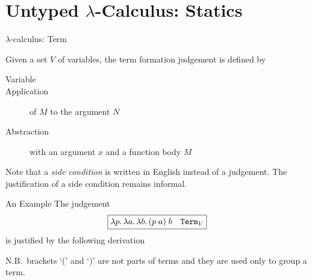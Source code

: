 \section{Untyped $\lambda$-Calculus: Statics}


\begin{frame}{$\lambda$-calculus: Term}

\begin{definition}
  Given a set $V$ of variables, 
  the term formation judgement is defined by
  \begin{description}
     \item[Variable]
       \hfill
       \begin{prooftree}
       \end{prooftree}
 
    \item[Application]
      of $M$ to the argument $N$
      \hfill
      \begin{prooftree}
      \end{prooftree}

    \item[Abstraction]
      with an argument $x$ and a function body $M$
      \hfill
      \begin{prooftree}
      \end{prooftree}
  \end{description}
\end{definition}
 
Note that a \emph{side condition} is written in English instead of a
judgement. The justification of a side condition remains informal.
 
\end{frame}


\begin{frame}{An Example}
  The judgement
\[
  \fbox{$\lambda p.\, \lambda a.\, \lambda b.\, (p\;a)\; b \quad \term_V$}
\]
is justified by the following derivation
  \begin{prooftree}
    \footnotesize
  \end{prooftree}
  N.B.\ brackets `(' and `)' are not parts of terms and they are used only to group a term.
\end{frame}

